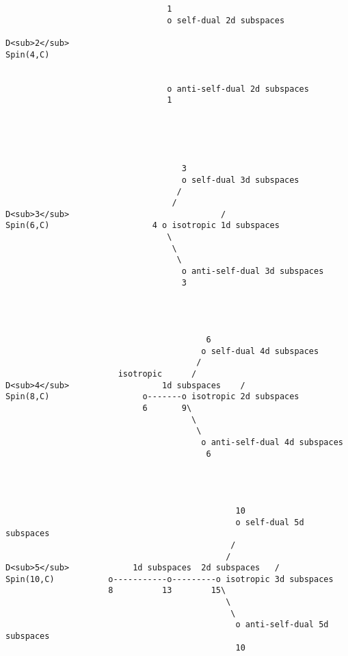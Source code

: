                                 
\begin{verbatim}
                                 1
                                 o self-dual 2d subspaces
                                 
D<sub>2</sub>                                      
Spin(4,C)                 
                 
                                    
                                 o anti-self-dual 2d subspaces
                                 1
                               




                                    3
                                    o self-dual 3d subspaces
                                   /
                                  /
D<sub>3</sub>                               /
Spin(6,C)                     4 o isotropic 1d subspaces
                                 \
                                  \
                                   \
                                    o anti-self-dual 3d subspaces
                                    3




                                         6
                                        o self-dual 4d subspaces
                                       /
                       isotropic      /
D<sub>4</sub>                   1d subspaces    /
Spin(8,C)                   o-------o isotropic 2d subspaces 
                            6       9\
                                      \
                                       \
                                        o anti-self-dual 4d subspaces
                                         6




                                               10
                                               o self-dual 5d subspaces
                                              /            
                                             / 
D<sub>5</sub>             1d subspaces  2d subspaces   /
Spin(10,C)           o-----------o---------o isotropic 3d subspaces
                     8          13        15\
                                             \
                                              \
                                               o anti-self-dual 5d subspaces
                                               10

\end{verbatim}
    

